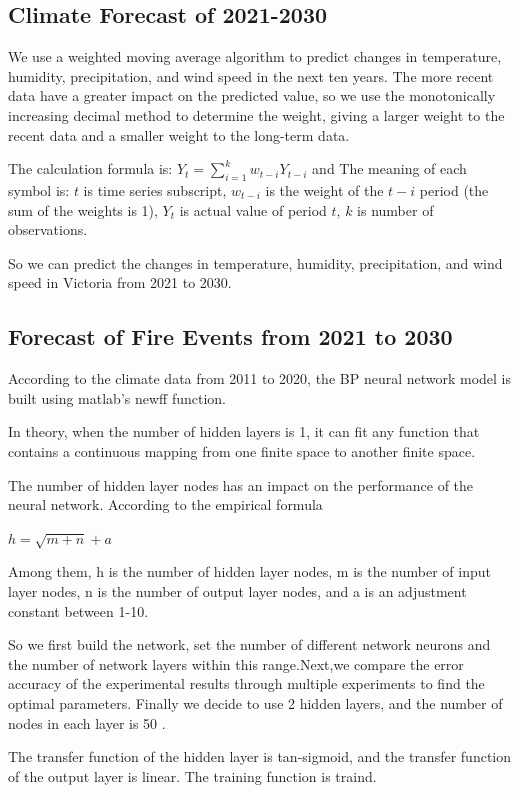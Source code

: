\documentclass{mcmthesis}
\begin{document}
\subsection{Climate Forecast of 2021-2030}

We use a weighted moving average algorithm to predict changes in temperature, humidity, precipitation, and wind speed in the next ten years. The more recent data have a greater impact on the predicted value, so we use the monotonically increasing decimal method to determine the weight, giving a larger weight to the recent data and a smaller weight to the long-term data.

The calculation formula is: $Y_t={\textstyle \sum_{i=1}^{k}}w_{t-i}Y_{t-i}$
and The meaning of each symbol is:
$t$ is time series subscript,
$w_{t-i}$ is the weight of the $t-i$ period (the sum of the weights is 1),
$Y_t$ is actual value of period $t$,
$k$ is number of observations.

So we can predict the changes in temperature, humidity, precipitation, and wind speed in Victoria from 2021 to 2030.

\subsection{Forecast of Fire Events from 2021 to 2030}

According to the climate data from 2011 to 2020, the BP neural network model is built using matlab's newff function.

In theory, when the number of hidden layers is 1, it can fit any function that contains a continuous mapping from one finite space to another finite space.

The number of hidden layer nodes has an impact on the performance of the neural network. According to the empirical formula

$h=\sqrt{m+n}+a$

Among them, h is the number of hidden layer nodes, m is the number of input layer nodes, n is the number of output layer nodes, and a is an adjustment constant between 1-10.

So we first build the network, set the number of different network neurons and the number of network layers within this range.Next,we compare the error accuracy of the experimental results through multiple experiments to find the optimal parameters. Finally we decide to use 2 hidden layers, and the number of nodes in each layer is 50 .

The transfer function of the hidden layer is tan-sigmoid, and the transfer function of the output layer is linear. The training function is traind.
\end{document}
